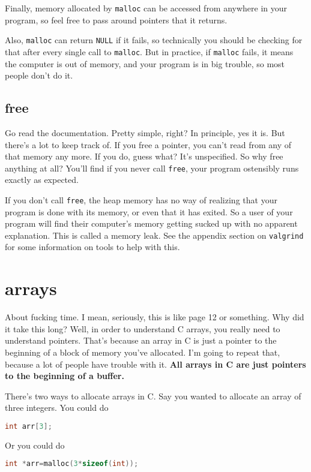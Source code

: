 \documentclass[ebook,11pt,oneside,openany]{memoir}
\newcommand{\cf}[1]{\texttt{#1}}
\begin{document}
Finally, memory allocated by \texttt{malloc} can be accessed from anywhere in your program, so feel free to pass around pointers that it returns.

Also, \cf{malloc} can return \cf{NULL} if it fails, so technically you should be checking for that after every single call to \cf{malloc}. But in practice, if \cf{malloc} fails, it means the computer is out of memory, and your program is in big trouble, so most people don't do it.

\subsection{free}
Go read the documentation. Pretty simple, right? In principle, yes it is. But there's a lot to keep track of. If you free a pointer, you can't read from any of that memory any more. If you do, guess what? It's unspecified. So why free anything at all? You'll find if you never call \texttt{free}, your program ostensibly runs exactly as expected.

If you don't call \texttt{free}, the heap memory has no way of realizing that your program is done with its memory, or even that it has exited. So a user of your program will find their computer's memory getting sucked up with no apparent explanation. This is called a memory leak. See the appendix section on \texttt{valgrind} for some information on tools to help with this.

\section{arrays}

About fucking time. I mean, seriously, this is like page 12 or something. Why did it take this long? Well, in order to understand C arrays, you really need to understand pointers. That's because an array in C is just a pointer to the beginning of a block of memory you've allocated. I'm going to repeat that, because a lot of people have trouble with it. \textbf{All arrays in C are just pointers to the beginning of a buffer.}

There's two ways to allocate arrays in C. Say you wanted to allocate an array of three integers. You could do

\begin{lstlisting}[language=C]
int arr[3];
\end{lstlisting}

Or you could do

\begin{lstlisting}[language=C]
int *arr=malloc(3*sizeof(int));
\end{lstlisting}
\end{document}
